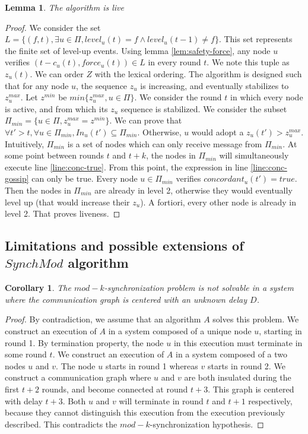 \documentclass[11pt,letterpaper]{article}
\newtheorem{lem}[thm]{Lemma}
\newtheorem{cor}[thm]{Corollary}
\begin{document}
\begin{lem}
	The algorithm is live
\end{lem}
\begin{proof}
	We consider the set $L = \{(f,t), \exists u \in \Pi, level_u(t) = f \wedge level_u(t-1) \neq f\}$.
	This set represents the finite set of level-up events.
	Using lemma \ref{lem:safety-force}, any node $u$ verifies $(t-c_u(t), force_u(t)) \in L$ in every round $t$.
	We note this tuple as $z_u(t)$.
	We can order $Z$ with the lexical ordering.
	The algorithm is designed such that for any node $u$, the sequence $z_u$ is increasing, and eventually stabilizes to $z_u^{max}$.
	Let $z^{min}$ be $min \{z_u^{max}, u \in \Pi\}$.
	We consider the round $t$ in which every node is active, and from which its $z_u$ sequence is stabilized.
	We consider the subset $\Pi_{min} = \{u \in \Pi, z_u^{max} = z^{min}\}$.
	We can prove that $\forall t' > t, \forall u \in \Pi_{min}, In_u(t') \subseteq \Pi_{min}$.
	Otherwise, $u$ would adopt a $z_u(t') > z_u^{max}$.
	Intuitively, $\Pi_{min}$ is a set of nodes which can only receive message from $\Pi_{min}$.
	At some point between rounds $t$ and $t+k$, the nodes in $\Pi_{min}$ will simultaneously execute line \ref{line:conc-true}.
	From this point, the expression in line \ref{line:conc-gossip} can only be true.
	Every node $u \in \Pi_{min}$ verifies $concordant_u(t') = true$.
	Then the nodes in $\Pi_{min}$ are already in level 2, otherwise they would eventually level up (that would increase their $z_u$).
	A fortiori, every other node is already in level 2.
	That proves liveness.
\end{proof}

\subsection{Limitations and possible extensions of $SynchMod$ algorithm}

\begin{cor}
	The $mod-k$-synchronization problem is not solvable in a system where the communication graph is centered with an unknown delay $D$.
\end{cor}
\begin{proof}
	By contradiction, we assume that an algorithm $A$ solves this problem.
	We construct an execution of $A$ in a system composed of a unique node $u$, starting in round 1.
	By termination property, the node $u$ in this execution must terminate in some round $t$.
	We construct an execution of $A$ in a system composed of a two nodes $u$ and $v$. The node $u$ starts in round 1 whereas $v$ starts in round 2.
	We construct a communication graph where $u$ and $v$ are both insulated during the first $t+2$ rounds, and become connected at round $t+3$.
	This graph is centered with delay $t+3$.
	Both $u$ and $v$ will terminate in round $t$ and $t+1$ respectively, because they cannot distinguish this execution from the execution previously described.
	This contradicts the $mod-k$-synchronization hypothesis.
\end{proof}
\end{document}
